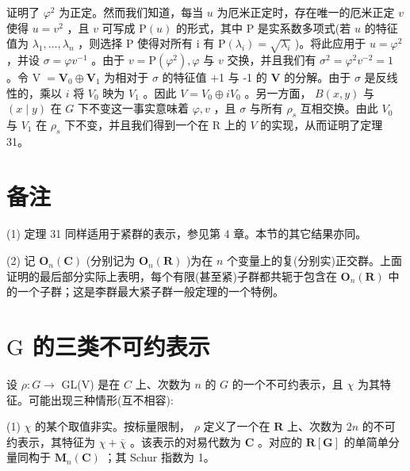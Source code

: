 \documentclass[10pt]{article}
\begin{document}
证明了 \({\varphi }^{2}\) 为正定。然而我们知道，每当 \(u\) 为厄米正定时，存在唯一的厄米正定 \(v\) 使得 \(u = {v}^{2}\) ，且 \(v\) 可写成 \(\mathrm{P}\left( u\right)\) 的形式，其中 \(\mathrm{P}\) 是实系数多项式(若 \(u\) 的特征值为 \({\lambda }_{1},\ldots ,{\lambda }_{n}\) ，则选择 \(\mathrm{P}\) 使得对所有 i 有 \(\mathrm{P}\left( {\lambda }_{i}\right)  = \sqrt{{\lambda }_{i}}\) )。将此应用于 \(u = {\varphi }^{2}\) ，并设 \(\sigma  = \varphi {v}^{-1}\) 。由于 \(v = \mathrm{P}\left( {\varphi }^{2}\right) ,\varphi\) 与 \(v\) 交换，并且我们有 \({\sigma }^{2} = {\varphi }^{2}{v}^{-2} = 1\) 。令 \(\mathrm{V} \; = {\mathbf{V}}_{0} \oplus  {\mathbf{V}}_{1}\) 为相对于 \(\sigma\) 的特征值 +1 与 -1 的 \(\mathbf{V}\) 的分解。由于 \(\sigma\) 是反线性的，乘以 \(i\) 将 \({V}_{0}\) 映为 \({V}_{1}\) 。因此 \(V = {V}_{0} \oplus  i{V}_{0}\) 。另一方面， \(B\left( {x,y}\right)\) 与 \(\left( {x \mid  y}\right)\) 在 \(G\) 下不变这一事实意味着 \(\varphi ,v\) ，且 \(\sigma\) 与所有 \({\rho }_{s}\) 互相交换。由此 \({V}_{0}\) 与 \({V}_{1}\) 在 \({\rho }_{s}\) 下不变，并且我们得到一个在 R 上的 \(V\) 的实现，从而证明了定理 31。

\section*{备注}

(1) 定理 31 同样适用于紧群的表示，参见第 4 章。本节的其它结果亦同。

(2) 记 \({\mathbf{O}}_{n}\left( \mathbf{C}\right)\) (分别记为 \({\mathbf{O}}_{n}\left( \mathbf{R}\right)\) )为在 \(n\) 个变量上的复(分别实)正交群。上面证明的最后部分实际上表明，每个有限(甚至紧)子群都共轭于包含在 \({\mathbf{O}}_{n}\left( \mathbf{R}\right)\) 中的一个子群；这是李群最大紧子群一般定理的一个特例。

\section*{\(\mathrm{G}\) 的三类不可约表示}

设 \(\rho  : G \rightarrow\) GL(V) 是在 \(C\) 上、次数为 \(n\) 的 \(G\) 的一个不可约表示，且 \(\chi\) 为其特征。可能出现三种情形(互不相容):

(1) \(\chi\) 的某个取值非实。按标量限制， \(\rho\) 定义了一个在 \(\mathbf{R}\) 上、次数为 \({2n}\) 的不可约表示，其特征为 \(\chi  + \overline{\chi }\) 。该表示的对易代数为 \(\mathbf{C}\) 。对应的 \(\mathbf{R}\left\lbrack  \mathbf{G}\right\rbrack\) 的单简单分量同构于 \({\mathbf{M}}_{n}\left( \mathbf{C}\right)\) ；其 Schur 指数为 1。
\end{document}
